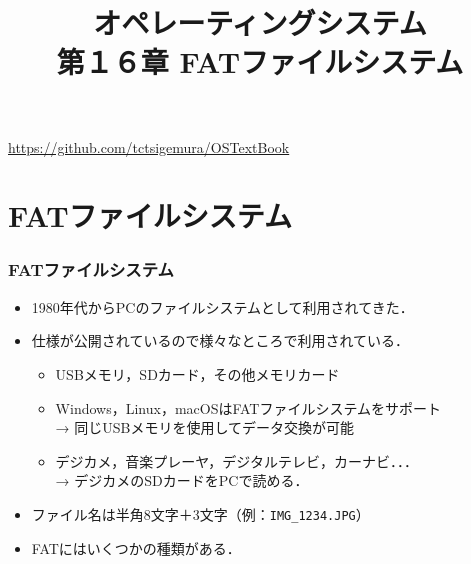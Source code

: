 \documentclass{beamer}                   %
\begin{document}
\title[FATファイルシステム]
      {オペレーティングシステム\\第１６章 FATファイルシステム}
\date{}
\begin{frame}
  \titlepage
  \centerline{\url{https://github.com/tctsigemura/OSTextBook}}
\end{frame}


\section{FATファイルシステム}
\begin{frame}
  \frametitle{FATファイルシステム}
  \begin{itemize}
  \item 1980年代からPCのファイルシステムとして利用されてきた．
  \item 仕様が公開されているので様々なところで利用されている．
    \begin{itemize}
    \item USBメモリ，SDカード，その他メモリカード
    \item Windows，Linux，macOSはFATファイルシステムをサポート \\
      → 同じUSBメモリを使用してデータ交換が可能
    \item デジカメ，音楽プレーヤ，デジタルテレビ，カーナビ．．． \\
      → デジカメのSDカードをPCで読める．
    \end{itemize}
  \item ファイル名は半角8文字＋3文字（例：\texttt{IMG\_1234.JPG}）
  \item FATにはいくつかの種類がある．
    \vfill
    \vfill
  \end{itemize}
\end{frame}
\end{document}
